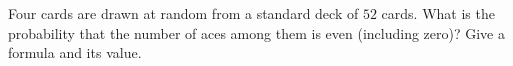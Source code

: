 Four cards are drawn at random from a standard deck of $52$ cards. What is the probability that the number of aces among them is even (including zero)? Give a formula and its value.
